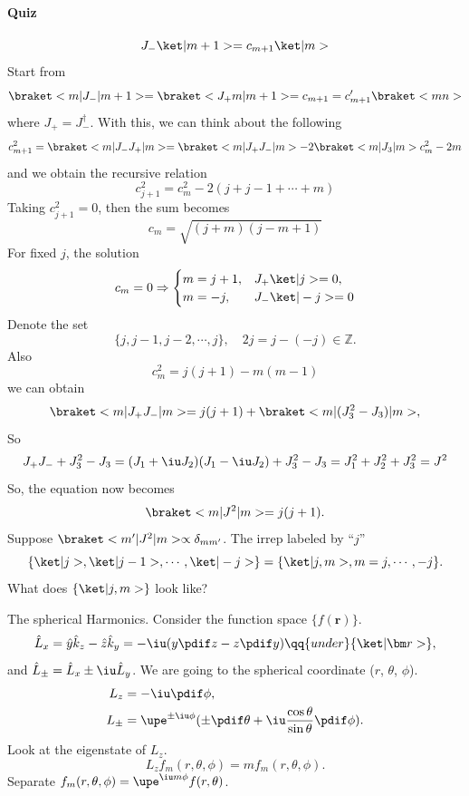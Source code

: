 \paragraph{Quiz}
\[
  J_-\ket|m + 1> = c_{m+1}\ket|m>
\]
Start from
\[
  \braket<m|J_-|m + 1>
= \braket<J_+m|m+1> = c_{m+1} = c_{m+1}' \braket<mn>
\]
where $J_+ = J_-^\dagger$.
With this, we can think about the following
\[
  c_{m+1}^2 = \braket<m|J_-J_+|m>
= \braket<m|J_+J_-|m> - 2\braket<m|J_3|m> c_m^2 - 2m
\]
and we obtain the recursive relation
\[
  c_{j+1}^2 = c_m^2 - 2(j + j - 1 + \cdots + m)
\]
Taking $c_{j+1}^2 = 0$, then the sum becomes
\[
  c_m = \sqrt{(j + m)(j - m + 1)}
\]
For fixed $j$, the solution
\[
  c_m = 0 \Rightarrow
  \begin{cases}
    m = j + 1,  & J_+ \ket|j>  = 0,\\
    m = -j,     & J_- \ket|-j> = 0
  \end{cases}
\]
Denote the set
\[
  \{j, j - 1, j - 2, \cdots, j\}, \quad
  2j = j - (-j) \in \mathbb Z.
\]
Also
\[
  c_m^2 = j(j + 1) - m(m - 1)
\]
we can obtain
\[
  \braket<m|J_+J_-|m>
= j(j + 1) + \braket<m|(J_3^2 - J_3)|m>,
\]
So
\[
  J_+J_- + J_3^2 - J_3
= (J_1 + \iu J_2) (J_1 - \iu J_2) + J_3^2 - J_3
= J_1^2 + J_2^2 + J_3^2 = J^2
\]
So, the equation now becomes
\[
  \braket<m|J^2|m> = j(j + 1).
\]
Suppose $\braket<m'|J^2|m> \propto \delta_{mm'}$.
The irrep labeled by ``$j$''
\[
  \{\ket|j>, \ket|j - 1>, \cdots, \ket|-j>\}
= \{\ket|j,m>, m = j, \cdots, -j\}.
\]
What does $\{\ket|j, m>\}$ look like?

The spherical Harmonics.
Consider the function space $\{f(\bm r)\}$.
\[
  \hat L_x = \hat y\hat k_z - \hat z\hat k_y
= -\iu(y\pdif z - z\pdif y) \qq{under} \{\ket|\bm r>\},
\]
and $\hat L_\pm = \hat L_x \pm \iu \hat L_y$.
We are going to the spherical coordinate ($r$, $\theta$, $\phi$).
\begin{align*}
  L_z   & = -\iu\pdif\phi,\\
  L_\pm & = \upe^{\pm\iu\phi}
    (\pm\pdif\theta + \iu\frac{\cos\theta}{\sin\theta}\pdif\phi).
\end{align*}
Look at the eigenstate of $L_z$.
\[
  L_z f_m(r,\theta,\phi) = m f_m(r,\theta,\phi).
\]
Separate $f_m(r,\theta,\phi) = \upe^{\iu m\phi}f(r,\theta)$.

